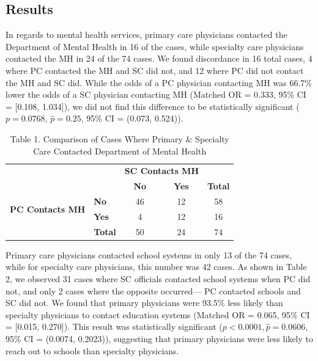 \documentclass{article}
\begin{document}
	\subsection*{Results}
	In regards to mental health services, primary care physicians contacted the Department of Mental Health in 16 of the cases, while specialty care physicians contacted the MH in 24 of the 74 cases. We found discordance in 16 total cases, 4 where PC contacted the MH and SC did not, and 12 where PC did not contact the MH and SC did. While the odds of a PC physician contacting MH was 66.7\% lower the odds of a SC physician contacting MH (Matched OR = 0.333,  95\% CI = [0.108, 1.034]), we did not find this difference to be statistically significant ($p = 0.0768$, $\hat{p} = 0.25$, 95\% CI = (0.073, 0.524)).



	\begin{table}[h]
		\centering
		\footnotesize
		\captionsetup{labelformat=empty}
		\caption{Table 1. Comparison of Cases Where Primary \& Specialty Care Contacted Department of Mental Health}
		\renewcommand{\arraystretch}{1.2}
		\begin{tabular}{llccc}
			\toprule
			& & \multicolumn{2}{c}{\textbf{SC Contacts MH}} & \\  
			\cmidrule(lr){3-4}
			& & \textbf{No} & \textbf{Yes} & \textbf{Total} \\  
			\midrule
			\multirow{2}{*}{\textbf{PC Contacts MH}} & \textbf{No} & 46 & 12 & 58 \\  
			& \textbf{Yes} & 4 & 12 & 16 \\  
			\midrule
			& \textbf{Total} & 50 & 24 & 74 \\  
			\bottomrule
		\end{tabular}
		\label{tab:pc_sc_mh}
	\end{table}


	Primary care physicians contacted school systems in only 13 of the 74 cases, while for specialty care physicians, this number was 42 cases. As shown in Table 2, we observed 31 cases where SC officials contacted school systems when PC did not, and only 2 cases where the opposite occurred— PC contacted schools and SC did not. We found that primary physicians were 93.5\% less likely than specialty physicians to contact education systems (Matched OR = 0.065, 95\% CI = [0.015, 0.270]). This result was statistically significant ($p < 0.0001, \hat{p} = 0.0606$, 95\% CI = (0.0074, 0.2023)), suggesting that primary physicians were less likely to reach out to schools than specialty physicians.
\end{document}
